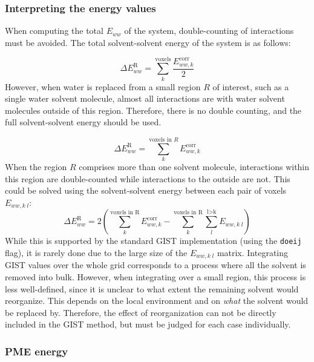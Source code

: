 \documentclass[9pt,tutorial]{livecoms}
\newcommand\inlinecode{\texttt}
\begin{document}
\subsubsection{Interpreting the energy values}
When computing the total $E_{ww}$ of the system, double-counting of interactions must be avoided.
The total solvent-solvent energy of the system is as follows:

\begin{equation}
	\Delta E^\text{R}_{ww} = \sum_{k}^\text{voxels} \frac{E_{ww,k}^\text{corr}}{2}
\end{equation}
However, when water is replaced from a small region $R$ of interest, such as a single water solvent molecule, almost all interactions are with water solvent molecules outside of this region.
Therefore, there is no double counting, and the full solvent-solvent energy should be used.

\begin{equation}
	\Delta E^\text{R}_{ww} = \sum_{k}^{\text{voxels in }R} E_{ww,k}^\text{corr}
\end{equation}
When the region $R$ comprises more than one solvent molecule, interactions within this region are double-counted while interactions to the outside are not.
This could be solved using the solvent-solvent energy between each pair of voxels $E_{ww,k\;l}$:
\begin{equation}
	\Delta E^\text{R}_{ww} = 2\left(\sum_{k}^\text{voxels in R} E_{ww,k}^\text{corr}-\sum_{k}^\text{voxels in R}\sum_{l}^\text{l>k} E_{ww, k\;l}\right)
\end{equation}
While this is supported by the standard GIST implementation (using the \inlinecode{doeij} flag), it is rarely done due to the large size of the $E_{ww,k\;l}$ matrix.
Integrating GIST values over the whole grid corresponds to a process where all the solvent is removed into bulk.
However, when integrating over a small region, this process is less well-defined, since it is unclear to what extent the remaining solvent would reorganize.
This depends on the local environment and on \emph{what} the solvent would be replaced by.
Therefore, the effect of reorganization can not be directly included in the GIST method, but must be judged for each case individually.

\subsubsection{PME energy}
\end{document}
